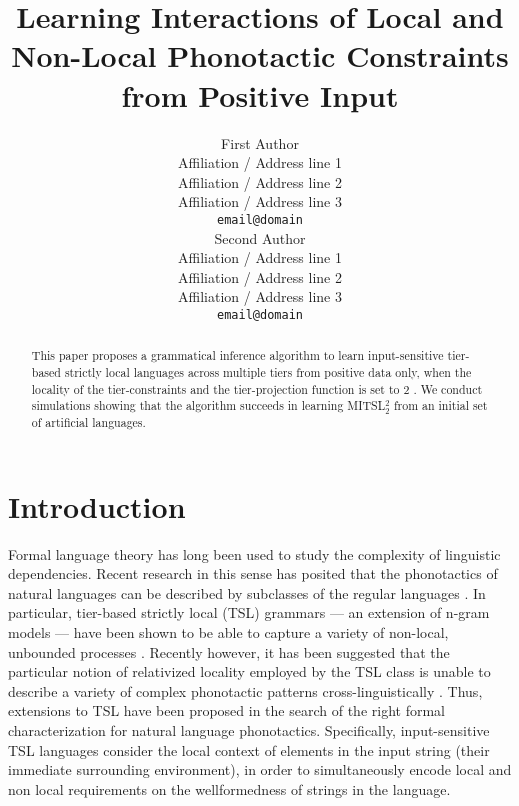 \documentclass[11pt,a4paper]{article}
\title{Learning Interactions of Local and Non-Local Phonotactic Constraints from Positive Input}
\author{First Author \\
  Affiliation / Address line 1 \\
  Affiliation / Address line 2 \\
  Affiliation / Address line 3 \\
  \texttt{email@domain} \\\And
  Second Author \\
  Affiliation / Address line 1 \\
  Affiliation / Address line 2 \\
  Affiliation / Address line 3 \\
  \texttt{email@domain} \\}
\date{}
\begin{document}
\maketitle
\begin{abstract}
This paper proposes a grammatical  inference algorithm to learn input-sensitive tier-based strictly local languages across multiple tiers from positive data only, when the locality of the tier-constraints and the tier-projection function is set to $2$ \cite[MITSL$^2_2$;][]{desanto2019structure}.\@
We  conduct simulations showing that the algorithm succeeds in learning MITSL$^2_2$ from an initial set of artificial languages.
\end{abstract}


\section{Introduction}

Formal language theory has long been used to study the complexity of linguistic dependencies.
Recent research in this sense has posited that the phonotactics of natural languages can be described by subclasses of the regular languages \citep[subregular classes;][]{Heinz2011a,Heinz2011b}.
In particular, tier-based strictly local (TSL) grammars  ---  an extension of n-gram models --- have been shown to be able to capture a variety of non-local, unbounded processes \cite{HeinzRawalTanner,McMullin16,McMullinHansson16}.
Recently however, it has been suggested that the particular notion of relativized locality employed by the TSL class is unable to describe a variety of complex phonotactic patterns cross-linguistically \citep[a.o.]{McMullin16,MayerMajor18}.
Thus, extensions to TSL have been proposed in the search of the right formal characterization for natural language phonotactics.
Specifically, input-sensitive TSL languages \citep[ITSL;][]{desanto2019structure} consider the local context of elements in the input string (their immediate surrounding environment), in order to simultaneously encode local and non local requirements on the wellformedness of strings in the language.
\end{document}
